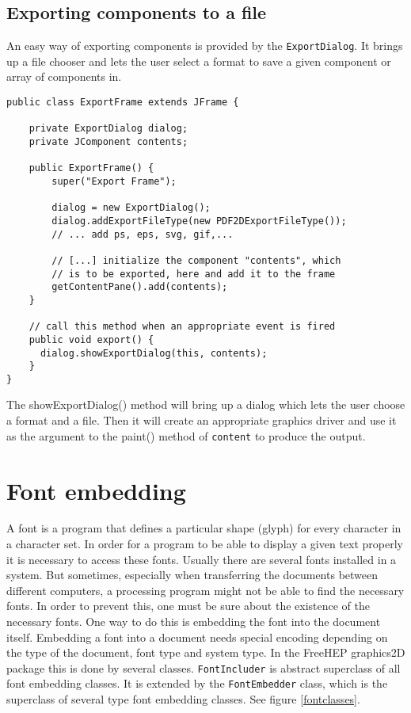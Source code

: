 \documentclass[a4paper]{article}
\newcommand{\freehep}{\textsf{FreeHEP}}
\newcommand{\class}[1]{\texttt{#1}}
\newcommand{\fhclass}[1]{\class{#1}}
\newcommand{\method}[1]{\textsf{#1}}
\newcommand{\code}[1]{\texttt{#1}}
\begin{document}
\subsection{Exporting components to a file}

An easy way of exporting components is provided by the
\fhclass{ExportDialog}. It brings up a file chooser and lets the user
select a format to save a given component or array of components in.
\medskip

\begin{verbatim}
public class ExportFrame extends JFrame {

    private ExportDialog dialog;
    private JComponent contents;

    public ExportFrame() {
        super("Export Frame");

        dialog = new ExportDialog();
        dialog.addExportFileType(new PDF2DExportFileType());
        // ... add ps, eps, svg, gif,...

        // [...] initialize the component "contents", which
        // is to be exported, here and add it to the frame
        getContentPane().add(contents);
    }

    // call this method when an appropriate event is fired
    public void export() {
      dialog.showExportDialog(this, contents);
    }
}
\end{verbatim}
\medskip

\noindent
The \method{showExportDialog()} method will bring up a dialog which
lets the user choose a format and a file. Then it will create an
appropriate graphics driver and use it as the argument to the
\method{paint()} method of \code{content} to produce the output.



\section{Font embedding}


A font is a program that defines a particular shape (glyph) for every
character in a character set. In order for a  program to be able to
display a given text properly it is necessary to access these
fonts. Usually there are several fonts installed in a system. But
sometimes, especially when transferring the documents between
different computers, a processing program might not be able to find the
necessary fonts. In order to prevent this, one must be sure
about the existence of  the necessary fonts. One way to do this is
embedding the font
into the document itself. Embedding a font into a document needs
special encoding depending on the type of the document, font type and
system type. In the \freehep{} graphics2D package this is done by several
classes. \fhclass{FontIncluder} is abstract superclass of all font embedding
classes. It is extended by the \fhclass{FontEmbedder} class, which is the superclass
of several type font embedding classes. See figure \ref{fontclasses}. 
\end{document}
